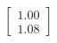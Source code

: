 \documentclass[preview]{standalone}
\begin{document}
\begin{align*}
\begin{bmatrix} 1.00 \\ 1.08 \end{bmatrix}
\end{align*}
\end{document}
